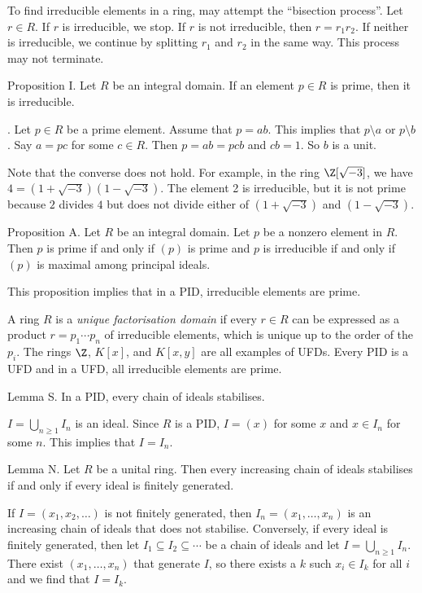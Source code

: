 To find irreducible elements in a ring, may attempt the ``bisection process''. Let $r\in R$. If $r$ is irreducible, we stop. If $r$ is not irreducible, then $r = r_1 r_2$. If neither is irreducible, we continue by splitting $r_1$ and $r_2$ in the same way. This process may not terminate.

\proclaim Proposition I. Let $R$ be an integral domain. If an element $p\in R$ is prime, then it is irreducible.

\proof. Let $p\in R$ be a prime element. Assume that $p=ab$. This implies that $p\setminus a$ or $p\setminus b$. Say $a = pc$ for some $c\in R$. Then $p=ab=pcb$ and $cb = 1$. So $b$ is a unit.\slug

Note that the converse does not hold. For example, in the ring $\Z[\sqrt{-3}]$, we have $4=(1+\sqrt {-3})(1-\sqrt {-3})$. The element 2 is irreducible, but it is not prime because $2$ divides $4$ but does not divide either of $(1+\sqrt{-3})$ and $(1-\sqrt{-3})$.

\proclaim Proposition A. Let $R$ be an integral domain. Let $p$ be a nonzero element in $R$. Then $p$ is prime if and only if $(p)$ is prime and $p$ is irreducible if and only if $(p)$ is maximal among principal ideals.\slug

This proposition implies that in a PID, irreducible elements are prime.

A ring $R$ is a {\it unique factorisation domain} if every $r\in R$ can be expressed as a product $r = p_1\cdots p_n$ of irreducible elements, which is unique up to the order of the $p_i$. The rings $\Z$, $K[x]$, and $K[x,y]$ are all examples of UFDs. Every PID is a UFD and in a UFD, all irreducible elements are prime.

\proclaim Lemma S. In a PID, every chain of ideals stabilises.

\proof $I = \bigcup_{n\geq 1} I_n$ is an ideal. Since $R$ is a PID, $I = (x)$ for some $x$ and $x\in I_n$ for some $n$. This implies that $I = I_n$.\slug

\proclaim Lemma N. Let $R$ be a unital ring. Then every increasing chain of ideals stabilises if and only if every ideal is finitely generated.

\proof If $I = (x_1,x_2,\ldots)$ is not finitely generated, then $I_n = (x_1,\ldots,x_n)$ is an increasing chain of ideals that does not stabilise. Conversely, if every ideal is finitely generated, then let $I_1\subseteq I_2\subseteq \cdots$ be a chain of ideals and let $I = \bigcup_{n\geq 1} I_n$. There exist $(x_1,\ldots,x_n)$ that generate $I$, so there exists a $k$ such $x_i\in I_k$ for all $i$ and we find that $I = I_k$.\slug

